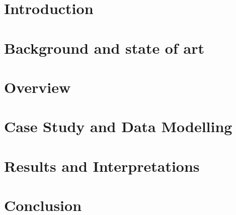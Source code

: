 \documentclass{Configuration_Files/PoliMi3i_thesis}
\begin{document}
\chapter{Introduction}
 

\chapter{Background and state of art}
\label{chap:background}


\chapter{Overview}
 \label{chap:Overview}
 

\chapter{Case Study and Data Modelling }
\label{chap:case}


\chapter{Results and Interpretations }
 \label{chap:res}


\chapter{Conclusion}
\label{chap:conclusion}







\cleardoublepage
{} %
\appendix


\printglossary[toctitle=Acronyms]


\begin{comment}
\chapter*{Acknowledgements}
Here you might want to acknowledge someone.

\end{comment}

\cleardoublepage
\end{document}
